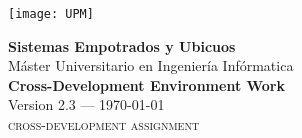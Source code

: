 \begin{titlepage}


\texttt{[image: UPM]}


\vfill\vspace{50pt}

\begin{center}
\textbf{\huge Sistemas Empotrados y Ubicuos}\\[\baselineskip]
{\large Máster Universitario en Ingeniería Infórmatica}\\[\baselineskip]
\textbf{\Huge Cross-Development Environment Work}\\[\baselineskip]
{\large Version 2.3 --- \today}\\[\baselineskip]
{\large\textsc{cross-development assignment}}
\end{center}

\vfill


\end{titlepage}
